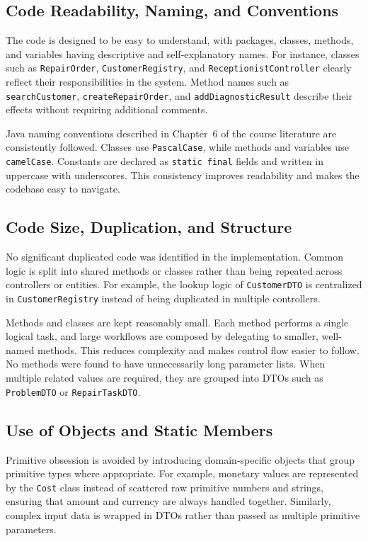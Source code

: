 \documentclass[a4paper]{scrartcl}
\begin{document}
\subsection{Code Readability, Naming, and Conventions}

The code is designed to be easy to understand, with packages, classes, methods, and variables having descriptive and self-explanatory names. For instance, classes such as \texttt{RepairOrder}, \texttt{CustomerRegistry}, and \texttt{ReceptionistController} clearly reflect their responsibilities in the system. Method names such as \texttt{searchCustomer}, \texttt{createRepairOrder}, and \texttt{addDiagnosticResult} describe their effects without requiring additional comments.

Java naming conventions described in Chapter~6 of the course literature are consistently followed. Classes use \texttt{PascalCase}, while methods and variables use \texttt{camelCase}. Constants are declared as \texttt{static final} fields and written in uppercase with underscores. This consistency improves readability and makes the codebase easy to navigate.

\subsection{Code Size, Duplication, and Structure}

No significant duplicated code was identified in the implementation. Common logic is split into shared methods or classes rather than being repeated across controllers or entities. For example, the lookup logic of \texttt{CustomerDTO} is centralized in \texttt{CustomerRegistry} instead of being duplicated in multiple controllers.

Methods and classes are kept reasonably small. Each method performs a single logical task, and large workflows are composed by delegating to smaller, well-named methods. This reduces complexity and makes control flow easier to follow. No methods were found to have unnecessarily long parameter lists. When multiple related values are required, they are grouped into DTOs such as \texttt{ProblemDTO} or \texttt{RepairTaskDTO}.

\subsection{Use of Objects and Static Members}

Primitive obsession is avoided by introducing domain-specific objects that group primitive types where appropriate. For example, monetary values are represented by the \texttt{Cost} class instead of scattered raw primitive numbers and strings, ensuring that amount and currency are always handled together. Similarly, complex input data is wrapped in DTOs rather than passed as multiple primitive parameters.
\end{document}

